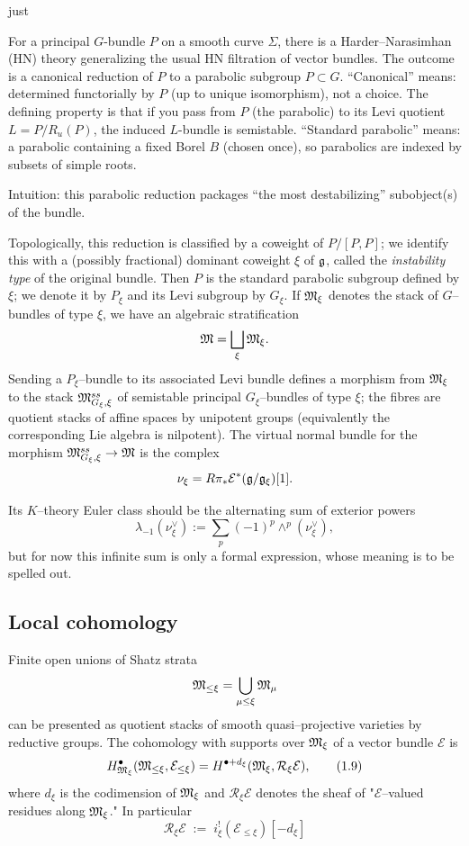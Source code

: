 just \documentclass[12pt]{article}
\begin{document}
\begin{remark}
    For a principal $G$-bundle $P$ on a smooth curve $\Sigma$, there is a Harder–Narasimhan (HN) theory generalizing the usual HN filtration of vector bundles. The outcome is a canonical reduction of $P$ to a parabolic subgroup $P\subset G$. “Canonical” means: determined functorially by $P$ (up to unique isomorphism), not a choice. The defining property is that if you pass from $P$ (the parabolic) to its Levi quotient $L=P/R_u(P)$, the induced $L$-bundle is semistable.
“Standard parabolic” means: a parabolic containing a fixed Borel $B$ (chosen once), so parabolics are indexed by subsets of simple roots.

Intuition: this parabolic reduction packages “the most destabilizing” subobject(s) of the bundle.
\end{remark}


Topologically, this reduction
is classified by a coweight of $P/[P,P]$; we identify this with a (possibly
fractional) dominant coweight $\xi$ of $\mathfrak{g}$, called the \emph{instability type}
of the original bundle.  Then $P$ is the standard parabolic subgroup defined by
$\xi$; we denote it by $P_\xi$ and its Levi subgroup by $G_\xi$.  If $\mathfrak{M}_\xi$
denotes the stack of $G$--bundles of type $\xi$, we have an algebraic
stratification 
\[
\mathfrak{M} = \bigsqcup_\xi \mathfrak{M}_\xi .
\]
Sending a $P_\xi$--bundle to its associated Levi bundle defines a morphism
from $\mathfrak{M}_\xi$ to the stack $\mathfrak{M}^{ss}_{G_\xi,\xi}$ of semistable principal
$G_\xi$--bundles of type $\xi$; the fibres are quotient stacks of affine spaces
by unipotent groups (equivalently the corresponding Lie algebra is nilpotent).  The virtual normal bundle for the morphism
$\mathfrak{M}^{ss}_{G_\xi,\xi} \to \mathfrak{M}$ is the complex
\[
\nu_\xi = R\pi_*\mathcal E^*(\mathfrak{g}/\mathfrak{g}_\xi)[1].
\]

Its $K$--theory Euler class should be the alternating sum of exterior powers
\[
\lambda_{-1}(\nu_\xi^\vee) := \sum_p (-1)^p \wedge^p(\nu_\xi^\vee),
\]
but for now this infinite sum is only a formal expression, whose meaning is to
be spelled out.

\subsection*{Local cohomology}

Finite open unions of Shatz strata
\[
\mathfrak{M}_{\le \xi} = \bigcup_{\mu\le \xi} \mathfrak{M}_\mu
\]
can be presented as quotient stacks of smooth quasi--projective varieties by
reductive groups.  The cohomology with supports over $\mathfrak{M}_\xi$ of a vector
bundle $\mathcal E$ is
\[
H^\bullet_{\mathfrak{M}_\xi}(\mathfrak{M}_{\le \xi},\mathcal E_{\le \xi})
= H^{\bullet + d_\xi}(\mathfrak{M}_\xi, \mathcal R_\xi \mathcal E),
\tag{1.9}
\]
where $d_\xi$ is the codimension of $\mathfrak{M}_\xi$ and $\mathcal R_\xi \mathcal E$
denotes the sheaf of "$\mathcal E$--valued residues along $\mathfrak{M}_\xi$." In particular \[\mathcal R_\xi \mathcal E \;:=\; i_\xi^! (\mathcal E_{\le \xi})[-d_\xi]\]
\end{document}
